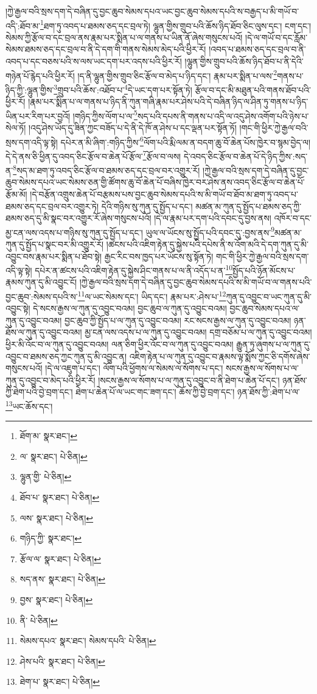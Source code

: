 །ཀྱེ་རྒྱལ་བའི་སྲས་དག་དེ་བཞིན་དུ་བྱང་ཆུབ་སེམས་དཔའ་ཡང་བྱང་ཆུབ་སེམས་དཔའི་ས་བརྒྱད་པ་མི་གཡོ་བ་འདི་:ཐོབ་མ་\footnote{ཐོག་མ་  སྣར་ཐང་། }ཐག་ཏུ་འབད་པ་ཐམས་ཅད་དང་བྲལ་ཏེ། ལྷུན་གྱིས་གྲུབ་པའི་ཆོས་ཉིད་ཐོབ་ཅིང་ལུས་དང་། ངག་དང་། སེམས་ཀྱི་རྩོལ་བ་དང་བྲལ་ནས་རྣམ་པར་སྨིན་པ་ལ་གནས་པ་ཡིན་ནོ་ཞེས་གསུངས་པའོ། །དེ་ལ་གཡོ་བ་དང་རློམ་སེམས་ཐམས་ཅད་དང་བྲལ་བ་ནི་དེ་དག་གི་གནས་སེམས་མེད་པའི་ཕྱིར་རོ། །འབད་པ་ཐམས་ཅད་དང་བྲལ་བ་ནི་འབད་པ་དང་བཅས་པའི་ས་ལས་ཡང་དག་པར་འདས་པའི་ཕྱིར་རོ། །ལྷུན་གྱིས་གྲུབ་པའི་ཆོས་ཉིད་ཐོབ་པ་ནི་དེའི་གཉེན་པོ་རྙེད་པའི་ཕྱིར་རོ། །ད་ནི་ལྷུན་གྱིས་གྲུབ་ཅིང་རྩོལ་བ་མེད་པ་ཉིད་དང་། རྣམ་པར་སྨིན་པ་ལས་\footnote{ལ་  སྣར་ཐང་།  པེ་ཅིན། }གནས་པ་ཉིད་ཀྱི་:ལྷུན་གྱིས་\footnote{ལྷུན་གྱི་  པེ་ཅིན། }གྲུབ་པའི་ཆོས་:འཐོབ་པ་\footnote{ཐོབ་པ་  སྣར་ཐང་།  པེ་ཅིན། }དེ་ཡང་དག་པར་སྟོན་ཏེ། རྩོལ་བ་དང་མི་མཐུན་པའི་གནས་ཐོབ་པའི་ཕྱིར་རོ། །རྣམ་པར་སྨིན་པ་ལ་གནས་པ་ཉིད་ནི་ཀུན་གཞི་རྣམ་པར་ཤེས་པའི་དེ་བཞིན་ཉིད་ལ་ཤིན་ཏུ་གནས་པ་ཉིད་ཡིན་པར་རིག་པར་བྱའོ། །གཉིད་ཀྱིས་ལོག་པ་ལ་\footnote{ལས་  སྣར་ཐང་།  པེ་ཅིན། }སད་པའི་དཔས་ནི་གནས་པ་འདི་ལ་འདུ་ཤེས་འགོག་པའི་ཉེས་པ་སེལ་ཏོ། །འདུ་ཤེས་ཡོད་དུ་ཟིན་ཀྱང་བཟོད་པ་དེ་ནི་དེ་ཁོ་ན་ཤེས་པ་དང་ལྡན་པར་སྟོན་ཏོ། །གང་གི་ཕྱིར་ཀྱེ་རྒྱལ་བའི་སྲས་དག་འདི་ལྟ་སྟེ། དཔེར་ན་མི་ཞིག་:གཉིད་ཀྱིས་\footnote{གཉིད་ཀྱི་  སྣར་ཐང་། }ལོག་པའི་རྨི་ལམ་ན་བདག་ཆུ་བོ་ཆེན་པོས་ཁྱེར་བ་སྙམ་བྱེད་ལ། དེ་དེ་ནས་ཅི་ཕྱིན་དུ་འབད་ཅིང་རྩོལ་བ་ཆེན་པོ་རྩོལ་\footnote{རྩོལ་ལ་  སྣར་ཐང་།  པེ་ཅིན། }རྩོལ་བ་ལས། དེ་འབད་ཅིང་རྩོལ་བ་ཆེན་པོ་དེ་ཉིད་ཀྱིས་:སད་ན་\footnote{སད་ནས་  སྣར་ཐང་།  པེ་ཅིན། }སད་མ་ཐག་ཏུ་འབད་ཅིང་རྩོལ་བ་ཐམས་ཅད་དང་བྲལ་བར་འགྱུར་རོ། །ཀྱེ་རྒྱལ་བའི་སྲས་དག་དེ་བཞིན་དུ་བྱང་ཆུབ་སེམས་དཔའ་ཡང་སེམས་ཅན་གྱི་ཚོགས་ཆུ་བོ་ཆེན་པོ་བཞིས་ཁྱེར་བར་ཤེས་ནས་འབད་ཅིང་རྩོལ་བ་ཆེན་པོ་རྩོམ་མོ། །དེ་བརྩོན་འགྲུས་ཆེན་པོ་བརྩམས་པས་བྱང་ཆུབ་སེམས་དཔའི་ས་མི་གཡོ་བ་ཐོབ་མ་ཐག་ཏུ་འབད་པ་ཐམས་ཅད་དང་བྲལ་བར་འགྱུར་ཏེ། དེའི་གཉིས་སུ་ཀུན་དུ་སྤྱོད་པ་དང་། མཚན་མ་ཀུན་དུ་སྤྱོད་པ་ཐམས་ཅད་ཀྱི་ཐམས་ཅད་དུ་མི་སྣང་བར་འགྱུར་རོ་ཞེས་གསུངས་པའོ། །དེ་ལ་རྣམ་པར་དག་པའི་དབང་དུ་བྱས་ནས། འཁོར་བ་དང་མྱ་ངན་ལས་འདས་པ་གཉིས་སུ་ཀུན་དུ་སྤྱོད་པ་དང་། ཡུལ་ལ་ཡོངས་སུ་སྤྱོད་པའི་དབང་དུ་:བྱས་ནས་\footnote{བྱས་  སྣར་ཐང་།  པེ་ཅིན། }མཚན་མ་ཀུན་དུ་སྤྱོད་པ་སྣང་བར་མི་འགྱུར་རོ། །ཚངས་པའི་འཇིག་རྟེན་དུ་སྐྱེས་པའི་དཔེས་ནི་ས་འོག་མའི་དེ་དག་ཀུན་དུ་མི་འབྱུང་བས་རྣམ་པར་སྨིན་པ་ཐོབ་སྟེ། རྒྱང་རིང་བས་ཁྱད་པར་ཡོངས་སུ་སྟོན་ཏེ། གང་གི་ཕྱིར་ཀྱེ་རྒྱལ་བའི་སྲས་དག་འདི་ལྟ་སྟེ། དཔེར་ན་ཚངས་པའི་འཇིག་རྟེན་དུ་སྐྱེས་ཤིང་གནས་པ་ལ་ནི་འདོད་པ་ན་\footnote{ནི་  པེ་ཅིན། }སྤྱོད་པའི་ཉོན་མོངས་པ་རྣམས་ཀུན་དུ་མི་འབྱུང་ངོ། །ཀྱེ་རྒྱལ་བའི་སྲས་དག་དེ་བཞིན་དུ་བྱང་ཆུབ་སེམས་དཔའི་ས་མི་གཡོ་བ་ལ་གནས་པའི་བྱང་ཆུབ་:སེམས་དཔའི་ས་\footnote{སེམས་དཔའ་  སྣར་ཐང་། སེམས་དཔའི་  པེ་ཅིན། }ལ་ཡང་སེམས་དང་། ཡིད་དང་། རྣམ་པར་:ཤེས་པ་\footnote{ཤེས་པའི་  སྣར་ཐང་།  པེ་ཅིན། }ཀུན་དུ་འབྱུང་བ་ཡང་ཀུན་དུ་མི་འབྱུང་སྟེ། དེ་སངས་རྒྱས་ལ་ཀུན་དུ་འབྱུང་བའམ། བྱང་ཆུབ་ལ་ཀུན་དུ་འབྱུང་བའམ། བྱང་ཆུབ་སེམས་དཔའ་ལ་ཀུན་དུ་འབྱུང་བའམ། བྱང་ཆུབ་ཀྱི་སྤྱོད་པ་ལ་ཀུན་དུ་འབྱུང་བའམ། རང་སངས་རྒྱས་ལ་ཀུན་དུ་འབྱུང་བའམ། ཉན་ཐོས་ལ་ཀུན་དུ་འབྱུང་བའམ། མྱ་ངན་ལས་འདས་པ་ལ་ཀུན་དུ་འབྱུང་བའམ། དགྲ་བཅོམ་པ་ལ་ཀུན་དུ་འབྱུང་བའམ། ཕྱིར་མི་འོང་བ་ལ་ཀུན་དུ་འབྱུང་བའམ། ལན་ཅིག་ཕྱིར་འོང་བ་ལ་ཀུན་དུ་འབྱུང་བའམ། རྒྱུན་ཏུ་ཞུགས་པ་ལ་ཀུན་དུ་འབྱུང་བ་ཐམས་ཅད་ཀྱང་ཀུན་དུ་མི་འབྱུང་ན། འཇིག་རྟེན་པ་ལ་ཀུན་དུ་འབྱུང་བ་རྣམས་ལྟ་སྨོས་ཀྱང་ཅི་དགོས་ཞེས་གསུངས་པའོ། །དེ་ལ་འཇུག་པ་དང་། ལོག་པའི་ཕྱོགས་ལ་སེམས་ལ་སོགས་པ་དང་། སངས་རྒྱས་ལ་སོགས་པ་ལ་ཀུན་དུ་འབྱུང་བ་མེད་པའི་ཕྱིར་རོ། །སངས་རྒྱས་ལ་སོགས་པ་ལ་ཀུན་དུ་འབྱུང་བ་ནི་ཐེག་པ་ཆེན་པོ་དང་། ཉན་ཐོས་ཀྱི་ཐེག་པའི་བྱེ་བྲག་དང་། ཐེག་པ་ཆེན་པོ་ལ་ཡང་གང་ཟག་དང་། ཆོས་ཀྱི་བྱེ་བྲག་དང་། ཉན་ཐོས་ཀྱི་:ཐེག་པ་ལ་\footnote{ཐེག་པ་  སྣར་ཐང་།  པེ་ཅིན། }ཡང་ཆོས་དང་། 